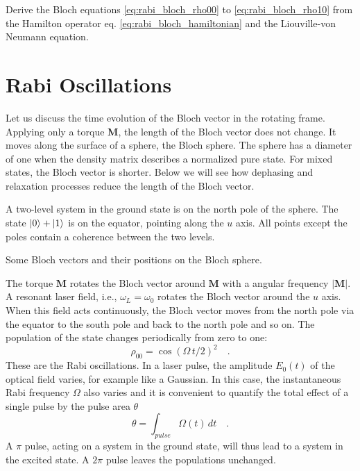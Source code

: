 \begin{questions}

\item Derive the Bloch  equations \ref{eq:rabi_bloch_rho00}  to \ref{eq:rabi_bloch_rho10}  
from the Hamilton operator eq. \ref{eq:rabi_bloch_hamiltonian} and the Liouville-von Neumann equation.

\end{questions}

\section{Rabi Oscillations}

Let us discuss the time evolution of the Bloch vector in the rotating frame. Applying only a torque $\boldsymbol{M}$, the length of the Bloch vector does not change. It moves along the surface of a sphere, the Bloch sphere. The sphere has a diameter of one when the density matrix describes a normalized pure state. For mixed states, the Bloch vector is shorter. Below we will see how dephasing and relaxation processes reduce the length of the Bloch vector.


A two-level system in the ground state is on the north pole of the sphere. The state $\ket{0} + \ket{1}$ is on the equator, pointing along the $u$ axis. All points except the poles contain a coherence between the two levels.


\begin{marginfigure}
\centering

\caption{Some Bloch vectors and their positions on the Bloch sphere. \label{fig:rabi_bloch_sphere}}
\end{marginfigure}


The torque $\boldsymbol{M}$ rotates the Bloch vector around  $\boldsymbol{M}$ with a angular frequency  $|\boldsymbol{M}|$. A resonant laser field, i.e., $\omega_L = \omega_0$ rotates the Bloch vector around the $u$ axis. When this field acts continuously, the Bloch vector moves from the north pole via the equator to the south pole and back to the north pole and so on. The population of the state changes periodically from zero to one:
\begin{equation}
 \rho_{00} = \cos ( \Omega \, t / 2)^2 \quad .
\end{equation}
These are the Rabi oscillations. In a laser pulse, the amplitude $E_0(t)$ of the optical field varies, for example like a Gaussian. In this case, the instantaneous Rabi frequency $\Omega$ also varies and it is convenient to quantify the total effect of a single pulse by the pulse area $\theta$
\begin{equation}
 \theta = \int_{pulse} \Omega (t) \, dt \quad .
\end{equation}
A $\pi$ pulse, acting on a system in the ground state, will thus lead to a system in the excited state. A $2\pi$ pulse leaves the populations unchanged.



